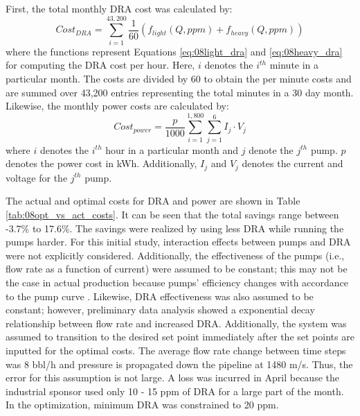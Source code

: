 First, the total monthly DRA cost was calculated by:
\begin{equation}
    Cost_{DRA} = \sum\limits^{43,200}_{i=1} \frac{1}{60} \left(f_{light}(Q, ppm) + f_{heavy}(Q, ppm)\right)
    \label{eq:08dra_cost}
\end{equation}
where the functions represent Equations \ref{eq:08light_dra} and \ref{eq:08heavy_dra} for computing the DRA cost per hour. Here, $i$ denotes the $i^{th}$ minute in a particular month. The costs are divided by 60 to obtain the per minute costs and are summed over 43,200 entries representing the total minutes in a 30 day month. Likewise, the monthly power costs are calculated by:
\begin{equation}
    Cost_{power} = \frac{p}{1000} \sum\limits^{1,800}_{i=1} \sum\limits^{6}_{j=1} I_j \cdot V_j
    \label{eq:08power_cost}
\end{equation}
where $i$ denotes the $i^{th}$ hour in a particular month and $j$ denote the $j^{th}$ pump. $p$ denotes the power cost in kWh. Additionally, $I_j$ and $V_j$ denotes the current and voltage for the $j^{th}$ pump.

The actual and optimal costs for DRA and power are shown in Table \ref{tab:08opt_vs_act_costs}.  It can be seen that the total savings range between -3.7\% to 17.6\%.  The savings were realized by using less DRA while running the pumps harder. For this initial study, interaction effects between pumps and DRA were not explicitly considered. Additionally, the effectiveness of the pumps (i.e., flow rate as a function of current) were assumed to be constant; this may not be the case in actual production because pumps' efficiency changes with accordance to the pump curve \cite{fluid_mechanics}. Likewise, DRA effectiveness was also assumed to be constant; however, preliminary data analysis showed a exponential decay relationship between flow rate and increased DRA.  Additionally, the system was assumed to transition to the desired set point immediately after the set points are inputted for the optimal costs. The average flow rate change between time steps was 8 bbl/h and pressure is propagated down the pipeline at 1480 m/s.  Thus, the error for this assumption is not large. A loss was incurred in April because the industrial sponsor used only 10 - 15 ppm of DRA for a large part of the month. In the optimization, minimum DRA was constrained to 20 ppm.

